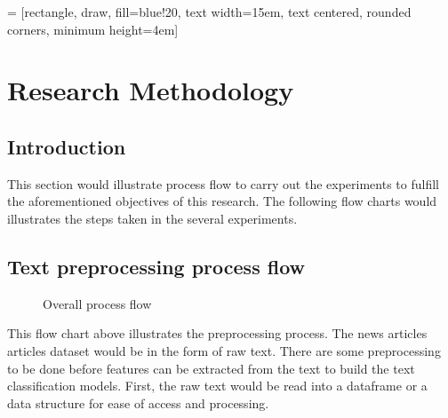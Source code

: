 
 = [rectangle, draw, fill=blue!20, 
text width=15em, text centered, rounded corners, minimum height=4em]


\chapter{Research Methodology}
\section{Introduction}
This section would illustrate process flow to carry out the experiments to fulfill the aforementioned objectives of this research. The following flow charts would illustrates the steps taken in the several experiments.

\section{Text preprocessing process flow}
\begin{figure} [ht]
\centering
{}
\caption{Overall process flow}
\label{fig: overallProcess}
\end{figure}

This flow chart above illustrates the preprocessing process. The news articles articles dataset would be in the form of raw text. There are some preprocessing to be done before features can be extracted from the text to build the text classification models. First, the raw text would be read into a dataframe or a data structure for ease of access and processing.

